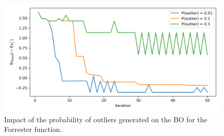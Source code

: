 \documentclass{article}
\begin{document}
\begin{figure}[ht]
  \centering
  \includegraphics[width=.8\linewidth]{imgs/prob_out.png}
  \caption{Impact of the probability of outliers generated on the BO for the Forrester function.}
  \label{fig:ninit}
\end{figure}




\end{document}
